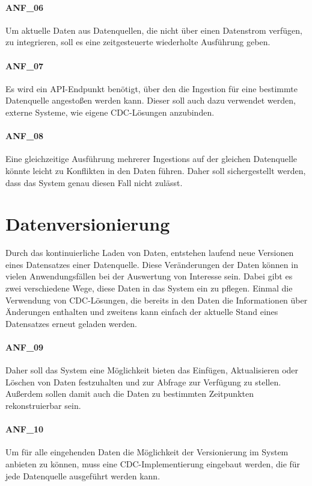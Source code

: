 \paragraph{ANF\_06}
\label{ANF_06}
Um aktuelle Daten aus Datenquellen, die nicht über einen Datenstrom verfügen, zu integrieren, soll es eine zeitgesteuerte wiederholte Ausführung geben.

\paragraph{ANF\_07}
\label{ANF_07}
Es wird ein API-Endpunkt benötigt, über den die Ingestion für eine bestimmte Datenquelle angestoßen werden kann.
Dieser soll auch dazu verwendet werden, externe Systeme, wie eigene CDC-Lösungen anzubinden.

\paragraph{ANF\_08}
\label{ANF_08}
Eine gleichzeitige Ausführung mehrerer Ingestions auf der gleichen Datenquelle könnte leicht zu Konflikten in den Daten führen.
Daher soll sichergestellt werden, dass das System genau diesen Fall nicht zulässt.

\section{Datenversionierung}
Durch das kontinuierliche Laden von Daten, entstehen laufend neue Versionen eines Datensatzes einer Datenquelle.
Diese Veränderungen der Daten können in vielen Anwendungsfällen bei der Auswertung von Interesse sein.
Dabei gibt es zwei verschiedene Wege, diese Daten in das System ein zu pflegen.
Einmal die Verwendung von CDC-Lösungen, die bereits in den Daten die Informationen über Änderungen enthalten und zweitens kann einfach der aktuelle Stand eines Datensatzes erneut geladen werden.

\paragraph{ANF\_09}
\label{ANF_09}
Daher soll das System eine Möglichkeit bieten das Einfügen, Aktualisieren oder Löschen von Daten festzuhalten und zur Abfrage zur Verfügung zu stellen.
Außerdem sollen damit auch die Daten zu bestimmten Zeitpunkten rekonstruierbar sein.

\paragraph{ANF\_10}
\label{ANF_10}
Um für alle eingehenden Daten die Möglichkeit der Versionierung im System anbieten zu können, muss eine CDC-Implementierung eingebaut werden, die für jede Datenquelle ausgeführt werden kann.

